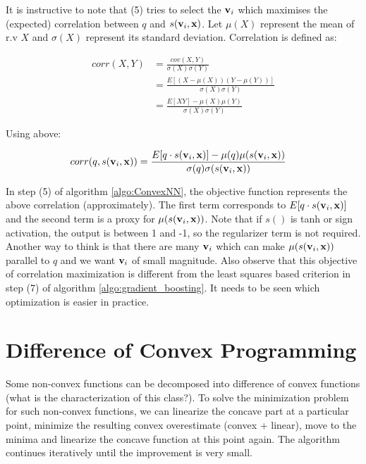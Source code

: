 \documentclass{article}
\begin{document}
It is instructive to note that (5) tries to select the ${\bf v}_i$ which maximises the (expected) correlation between $q$ and $s({\bf v}_i, {\bf x})$. Let $\mu(X)$ represent the mean of r.v $X$ and $\sigma(X)$ represent its standard deviation. Correlation is defined as:

\begin{align}
corr(X, Y) &= \frac{cov(X, Y)}{\sigma(X)\sigma(Y)} \\
	&= \frac{E[(X - \mu(X))(Y - \mu(Y))]}{\sigma(X)\sigma(Y)} \\
	&= \frac{E[XY] - \mu(X)\mu(Y)}{\sigma(X)\sigma(Y)} 
\end{align}  

Using above:

\begin{align}
\label{eq:correlation}
corr(q, s({\bf v}_i, {\bf x})) &= \frac{E[q \cdot s({\bf v}_i, {\bf x})] - \mu(q)\mu(s({\bf v}_i, {\bf x}))}{\sigma(q)\sigma(s({\bf v}_i, {\bf x}))} 
\end{align}  

In step (5) of algorithm \ref{algo:ConvexNN}, the objective function represents the above correlation (approximately). The first term corresponds to $E[q \cdot s({\bf v}_i, {\bf x})]$ and the second term is a proxy for $\mu(s({\bf v}_i, {\bf x}))$. Note that if $s()$ is tanh or sign activation, the output is between 1 and -1, so the regularizer term is not required. Another way to think is that there are many  ${\bf v}_i$ which can make $\mu(s({\bf v}_i, {\bf x}))$ parallel to $q$ and we want ${\bf v}_i$ of small magnitude. Also observe that this objective of correlation maximization is different from the least squares based criterion in step (7) of algorithm \ref{algo:gradient_boosting}. It needs to be seen which optimization is easier in practice.

\section{Difference of Convex Programming}

Some non-convex functions can be decomposed into difference of convex functions (what is the characterization of this class?). To solve the minimization problem for such non-convex functions, we can linearize the concave part at a particular point, minimize the resulting convex overestimate (convex + linear), move to the minima and linearize the concave function at this point again. The algorithm continues iteratively until the improvement is very small.
\end{document}
